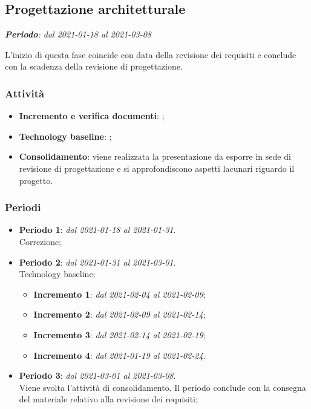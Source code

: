 \subsection{Progettazione architetturale}
\textit{\textbf{Periodo}: dal 2021-01-18 al 2021-03-08}

L'inizio di questa fase coincide con data della revisione dei requisiti e conclude con la scadenza della revisione di progettazione.

\subsubsection{Attività}

\begin{itemize}
\item \textbf{Incremento e verifica documenti}: ;
\item \textbf{Technology baseline}: ;
\item \textbf{Consolidamento}: viene realizzata la presentazione da esporre in sede di revisione di progettazione e si approfondiscono aspetti lacunari riguardo il progetto.
\end{itemize}

\subsubsection{Periodi}

\begin{itemize}
\item \textbf{Periodo 1}: \textit{dal 2021-01-18 al 2021-01-31}. \\
Correzione;
\item \textbf{Periodo 2}: \textit{dal 2021-01-31 al 2021-03-01}. \\
Technology baseline;
\begin{itemize}
\item \textbf{Incremento 1}: \textit{dal 2021-02-04 al 2021-02-09};
\item \textbf{Incremento 2}: \textit{dal 2021-02-09 al 2021-02-14};
\item \textbf{Incremento 3}: \textit{dal 2021-02-14 al 2021-02-19};
\item \textbf{Incremento 4}: \textit{dal 2021-01-19 al 2021-02-24}.
\end{itemize}
\item \textbf{Periodo 3}: \textit{dal 2021-03-01 al 2021-03-08}. \\
Viene svolta l'attività di consolidamento. Il periodo conclude con la consegna del materiale relativo alla revisione dei requisiti;
\end{itemize}


